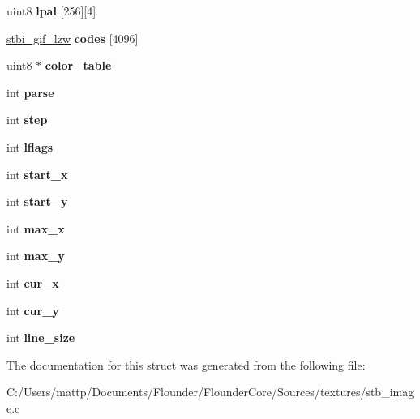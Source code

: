 \begin{DoxyCompactItemize}
\mbox{\label{structstbi__gif__struct_af2bf4a7890065ce54b8b59c6fd008e5f}} 
uint8 {\bfseries lpal} \mbox{[}256\mbox{]}\mbox{[}4\mbox{]}
\item 
\mbox{\label{structstbi__gif__struct_a4644d2fe2c84e410ab235ea415e9a740}} 
\hyperlink{structstbi__gif__lzw__struct}{stbi\+\_\+gif\+\_\+lzw} {\bfseries codes} \mbox{[}4096\mbox{]}
\item 
\mbox{\label{structstbi__gif__struct_aa10fee29a36ac4b9cae98300f839d091}} 
uint8 $\ast$ {\bfseries color\+\_\+table}
\item 
\mbox{\label{structstbi__gif__struct_a7a57ec19955875d52af26851ef332db8}} 
int {\bfseries parse}
\item 
\mbox{\label{structstbi__gif__struct_a61556e0a3ff8f19fa80401de5da1f079}} 
int {\bfseries step}
\item 
\mbox{\label{structstbi__gif__struct_a01e6981357bbd283177f70f87050a49d}} 
int {\bfseries lflags}
\item 
\mbox{\label{structstbi__gif__struct_ad3899ad3323686e963a7322e9a80bb05}} 
int {\bfseries start\+\_\+x}
\item 
\mbox{\label{structstbi__gif__struct_a7f4974b80d6e6f4f56b5fd02a9c1c121}} 
int {\bfseries start\+\_\+y}
\item 
\mbox{\label{structstbi__gif__struct_a02391438194b161d16bdf95878be6a66}} 
int {\bfseries max\+\_\+x}
\item 
\mbox{\label{structstbi__gif__struct_aff3410e0fff097d4719e54096f6da69b}} 
int {\bfseries max\+\_\+y}
\item 
\mbox{\label{structstbi__gif__struct_adbc7ae7e9ff2e2abdf66eb0e1a4b3ffb}} 
int {\bfseries cur\+\_\+x}
\item 
\mbox{\label{structstbi__gif__struct_ac61865216c4b578c235f5b8170c2036c}} 
int {\bfseries cur\+\_\+y}
\item 
\mbox{\label{structstbi__gif__struct_a5b7d7625c253025ff5ee4169afbf06b7}} 
int {\bfseries line\+\_\+size}
\end{DoxyCompactItemize}


The documentation for this struct was generated from the following file\+:\begin{DoxyCompactItemize}
\item 
C\+:/\+Users/mattp/\+Documents/\+Flounder/\+Flounder\+Core/\+Sources/textures/stb\+\_\+image.\+c\end{DoxyCompactItemize}
